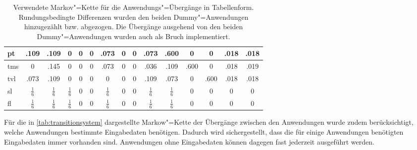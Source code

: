 \begin{table}
{\begin{tabular}{|l|c|c|c|c|c|c|c|c|c|c|c|c|c|c|}
    	\acs{pt}  &     .109      &     .109      &       0       &     0     &    0     &     .073      &    0     &     0     &     .073      &     .600      &     0     &     0     &   .018   &   .018   \\ \hline
    	\acs{tms} &       0       &     .145      &       0       &     0     &    0     &     .073      &    0     &     0     &     .036      &     .109      &   .600    &     0     &   .018   &   .019   \\ \hline
    	\acs{tvl} &     .073      &     .109      &       0       &     0     &    0     &       0       &    0     &     0     &     .109      &     .073      &     0     &   .600    &   .018   &   .018   \\ \hline
    	\acs{sl}  & $\frac{1}{6}$ & $\frac{1}{6}$ & $\frac{1}{6}$ &     0     &    0     & $\frac{1}{6}$ &    0     &     0     & $\frac{1}{6}$ & $\frac{1}{6}$ &     0     &     0     &    0     &    0     \\ \hline
    	\acs{fl}  & $\frac{1}{6}$ & $\frac{1}{6}$ & $\frac{1}{6}$ &     0     &    0     & $\frac{1}{6}$ &    0     &     0     & $\frac{1}{6}$ & $\frac{1}{6}$ &     0     &     0     &    0     &    0     \\ \hline
    \end{tabular}}
    \caption[Verwendete Markov"=Kette für die Anwendungs"=Übergänge in Tabellenform]
    {Verwendete Markov"=Kette für die Anwendungs"=Übergänge in Tabellenform.
        Rundungsbedingte Differenzen wurden den beiden Dummy"=Anwendungen hinzugezählt bzw. abgezogen.
        Die Übergänge ausgehend von den beiden Dummy"=Anwendungen wurden auch als Bruch implementiert.}
    \label{tab:transitionsystem}
\end{table}

Für die in \autoref{tab:transitionsystem} dargestellte Markow"=Kette der Übergänge zwischen den Anwendungen wurde zudem berücksichtigt, welche Anwendungen bestimmte Eingabedaten benötigen.
Dadurch wird sichergestellt, dass die für einige Anwendungen benötigten Eingabedaten immer vorhanden sind.
Anwendungen ohne Eingabedaten können dagegen fast jederzeit ausgeführt werden.
